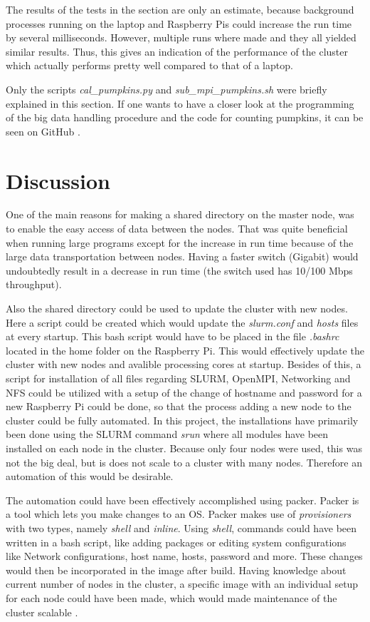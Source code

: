 \documentclass[../Head/Report.tex]{subfiles}
\begin{document}
The results of the tests in the section are only an estimate, because background processes running on the laptop and Raspberry Pis could increase the run time by several milliseconds. However, multiple runs where made and they all yielded similar results. Thus, this gives an indication of the performance of the cluster which actually performs pretty well compared to that of a laptop. 

Only the scripts \textit{cal\_pumpkins.py} and \textit{sub\_mpi\_pumpkins.sh} were briefly explained in this section. If one wants to have a closer look at the programming of the big data handling procedure and the code for counting pumpkins, it can be seen on GitHub \cite{kenni_github}. 
 
\section{Discussion}
One of the main reasons for making a shared directory on the master node, was to enable the easy access of data between the nodes. That was quite beneficial when running large programs except for the increase in run time because of the large data transportation between nodes. Having a faster switch (Gigabit) would undoubtedly result in a decrease in run time (the switch used has 10/100 Mbps throughput).  

Also the shared directory could be used to update the cluster with new nodes. Here a script could be created which would update the \textit{slurm.conf} and \textit{hosts} files at every startup. This bash script would have to be placed in the file \textit{.bashrc} located in the home folder on the Raspberry Pi. This would effectively update the cluster with new nodes and avalible processing cores at startup. Besides of this, a script for installation of all files regarding SLURM, OpenMPI, Networking and NFS could be utilized with a setup of the change of hostname and password for a new Raspberry Pi could be done, so that the process adding a new node to the cluster could be fully automated. In this project, the installations have primarily been done using the SLURM command \textit{srun} where all modules have been installed on each node in the cluster. Because only four nodes were used, this was not the big deal, but is does not scale to a cluster with many nodes. Therefore an automation of this would be desirable.  

The automation could have been effectively accomplished using packer. Packer is a tool which lets you make changes to an OS. Packer makes use of \textit{provisioners} with two types, namely \textit{shell} and \textit{inline}. Using \textit{shell}, commands could have been written in a bash script, like adding packages or editing system configurations like Network configurations, host name, hosts, password and more. These changes would then be incorporated in the image after build. Having knowledge about current number of nodes in the cluster, a specific image with an individual setup for each node could have been made, which would made maintenance of the cluster scalable \cite{packer}.      
\end{document}
